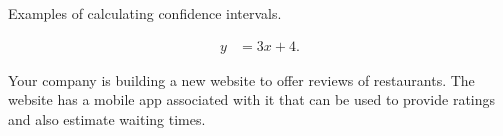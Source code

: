 

\begin{problem}
\item Examples of calculating confidence intervals.

  \begin{subproblem}
  \item 
    \begin{eqnarray}
      y & = 3x + 4.
    \end{eqnarray}
    \vfill
  \end{subproblem}


\end{problem}



Your company is building a new website to offer reviews of
restaurants. The website has a mobile app associated with it that can
be used to provide ratings and also estimate waiting times.

